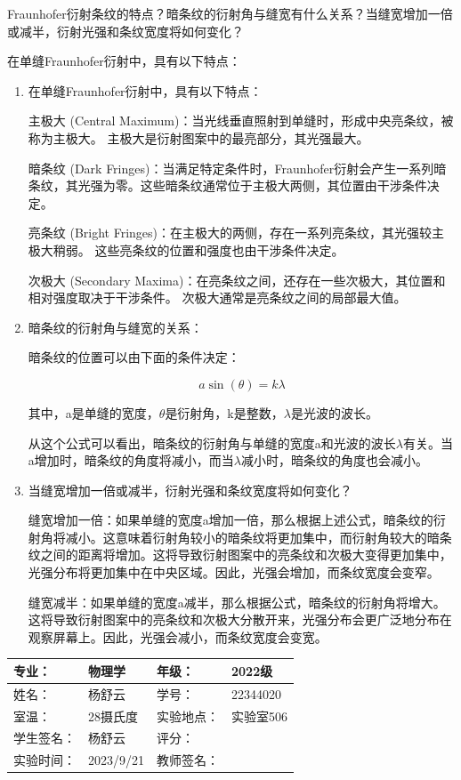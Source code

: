 \documentclass[dvipsnames, svgnames,a4paper,11pt]{article}
\begin{document}
	\begin{question}
		Fraunhofer衍射条纹的特点？暗条纹的衍射角与缝宽有什么关系？当缝宽增加一倍或减半，衍射光强和条纹宽度将如何变化？
	\end{question}	
	在单缝Fraunhofer衍射中，具有以下特点：
	\begin{enumerate}
		\item 在单缝Fraunhofer衍射中，具有以下特点：
		
		主极大 (Central Maximum)：当光线垂直照射到单缝时，形成中央亮条纹，被称为主极大。
		主极大是衍射图案中的最亮部分，其光强最大。
		
		暗条纹 (Dark Fringes)：当满足特定条件时，Fraunhofer衍射会产生一系列暗条纹，其光强为零。这些暗条纹通常位于主极大两侧，其位置由干涉条件决定。
		
		亮条纹 (Bright Fringes)：在主极大的两侧，存在一系列亮条纹，其光强较主极大稍弱。
		这些亮条纹的位置和强度也由干涉条件决定。
		
		次极大 (Secondary Maxima)：在亮条纹之间，还存在一些次极大，其位置和相对强度取决于干涉条件。
		次极大通常是亮条纹之间的局部最大值。		
		\item 暗条纹的衍射角与缝宽的关系：
		
		暗条纹的位置可以由下面的条件决定：
		
		\[a\sin(\theta) = k\lambda\]
		
		其中，a是单缝的宽度，$\theta$是衍射角，k是整数，$\lambda$是光波的波长。
		
		从这个公式可以看出，暗条纹的衍射角与单缝的宽度a和光波的波长$\lambda$有关。当a增加时，暗条纹的角度将减小，而当$\lambda$减小时，暗条纹的角度也会减小。		
		\item 当缝宽增加一倍或减半，衍射光强和条纹宽度将如何变化？
		
		缝宽增加一倍：如果单缝的宽度a增加一倍，那么根据上述公式，暗条纹的衍射角将减小。这意味着衍射角较小的暗条纹将更加集中，而衍射角较大的暗条纹之间的距离将增加。这将导致衍射图案中的亮条纹和次极大变得更加集中，光强分布将更加集中在中央区域。因此，光强会增加，而条纹宽度会变窄。
		
		缝宽减半：如果单缝的宽度a减半，那么根据公式，暗条纹的衍射角将增大。这将导致衍射图案中的亮条纹和次极大分散开来，光强分布会更广泛地分布在观察屏幕上。因此，光强会减小，而条纹宽度会变宽。		 
	\end{enumerate}
	
	
		
	\clearpage
	\begin{table}
		\renewcommand\arraystretch{1.7}
		\centering
		\begin{tabularx}{\textwidth}{|X|X|X|X|}
			\hline
			专业： & 物理学 & 年级： & 2022级 \\
			\hline
			姓名： & 杨舒云 & 学号： & 22344020\\
			\hline
			室温： & 28摄氏度 & 实验地点： & 实验室506 \\
			\hline
			学生签名：& 杨舒云 & 评分： &\\
			\hline
			实验时间：& 2023/9/21 & 教师签名：&\\
			\hline
		\end{tabularx}
	\end{table}
	
\end{document}
